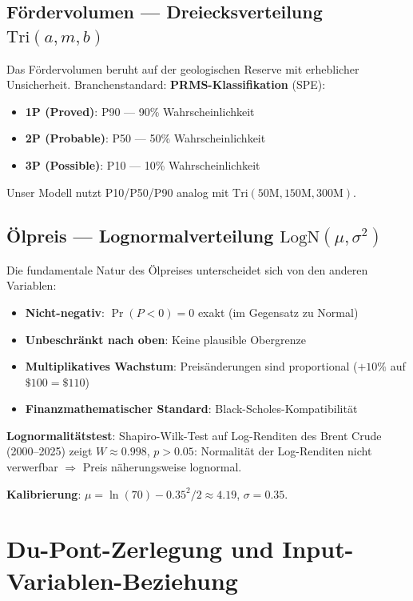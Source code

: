 \documentclass[12pt,a4paper]{article}
\begin{document}
\subsection{Fördervolumen --- Dreiecksverteilung $\text{Tri}(a, m, b)$}

Das Fördervolumen beruht auf der geologischen Reserve mit erheblicher Unsicherheit. Branchenstandard: \textbf{PRMS-Klassifikation} (SPE):
\begin{itemize}
\item \textbf{1P (Proved)}: P90 --- 90\% Wahrscheinlichkeit
\item \textbf{2P (Probable)}: P50 --- 50\% Wahrscheinlichkeit
\item \textbf{3P (Possible)}: P10 --- 10\% Wahrscheinlichkeit
\end{itemize}

Unser Modell nutzt P10/P50/P90 analog mit $\text{Tri}(50\text{M}, 150\text{M}, 300\text{M})$.

\subsection{Ölpreis --- Lognormalverteilung $\text{LogN}(\mu, \sigma^2)$}

Die fundamentale Natur des Ölpreises unterscheidet sich von den anderen Variablen:

\begin{itemize}
\item \textbf{Nicht-negativ}: $\Pr(P < 0) = 0$ exakt (im Gegensatz zu Normal)
\item \textbf{Unbeschränkt nach oben}: Keine plausible Obergrenze
\item \textbf{Multiplikatives Wachstum}: Preisänderungen sind proportional ($+10\%$ auf $\$100 = \$110$)
\item \textbf{Finanzmathematischer Standard}: Black-Scholes-Kompatibilität
\end{itemize}

\textbf{Lognormalitätstest}: Shapiro-Wilk-Test auf Log-Renditen des Brent Crude (2000--2025) zeigt $W \approx 0.998$, $p > 0.05$: Normalität der Log-Renditen nicht verwerfbar $\Rightarrow$ Preis näherungsweise lognormal.

\textbf{Kalibrierung}: $\mu = \ln(70) - 0.35^2/2 \approx 4.19$, $\sigma = 0.35$.

\section{Du-Pont-Zerlegung und Input-Variablen-Beziehung}
\end{document}

